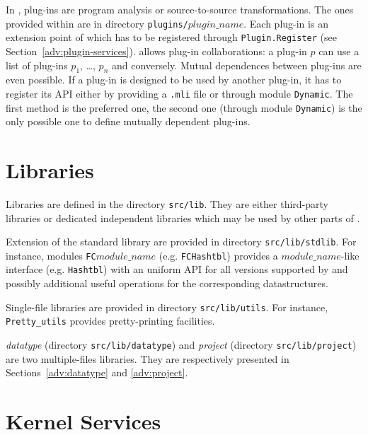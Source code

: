 In \framac, plug-ins are program analysis or source-to-source
transformations. The ones provided within \framac are in directory
\texttt{plugins/$plugin\_name$}. Each plug-in is an extension point of \framac which
has to be registered through \texttt{Plugin.Register}
(see Section~\ref{adv:plugin-services}). \framac allows plug-in collaborations:
a plug-in $p$ can use a list of plug-ins $p_1$, \dots, $p_n$ and
conversely. Mutual dependences between plug-ins are even possible. If a plug-in
is designed to be used by another plug-in, it has to register its API either by
providing a \texttt{.mli} file or through module
\texttt{Dynamic}. The first method
is the preferred one, the second one (through module \texttt{Dynamic}) is the
only possible one to define mutually dependent plug-ins.


\section{Libraries}\label{archi:libraries}

Libraries are defined in the directory \texttt{src/lib}. They are either
third-party libraries or dedicated independent libraries which may be used by
other parts of \framac.

Extension of the \caml standard library are provided in directory
\texttt{src/lib/stdlib}. For instance, modules \texttt{FC$module\_name$}
(e.g. \texttt{FCHashtbl}) provides a
\texttt{$module\_name$}-like interface (e.g. \texttt{Hashtbl}) with an uniform
API for all \ocaml versions supported by \framac and possibly additional useful
operations for the corresponding datastructures.

Single-file libraries are provided in directory
\texttt{src/lib/utils}. For instance,
\texttt{Pretty\_utils} provides pretty-printing
facilities.

\emph{datatype} (directory \texttt{src/lib/datatype}) and \emph{project}
(directory \texttt{src/lib/project}) are two multiple-files
libraries. They are respectively presented in Sections~\ref{adv:datatype} and
\ref{adv:project}.


\section{Kernel Services}\label{archi:services}

